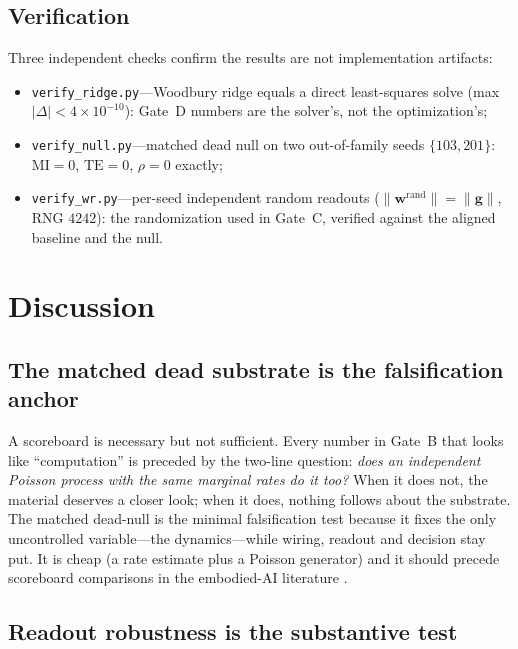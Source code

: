 \documentclass[10pt,a4paper]{article}
\newcommand{\MI}{\ensuremath{\mathrm{MI}}}
\newcommand{\TE}{\ensuremath{\mathrm{TE}}}
\begin{document}
\subsection{Verification}\label{sec:verify}
Three independent checks confirm the results are not implementation
artifacts:
\begin{itemize}[nosep]
\item \texttt{verify\_ridge.py}---Woodbury ridge equals a direct
least-squares solve (max $|\Delta|<4\times10^{-10}$): Gate~D numbers
are the solver's, not the optimization's;
\item \texttt{verify\_null.py}---matched dead null on two out-of-family
seeds $\{103,201\}$: $\MI=0$, $\TE=0$, $\rho=0$ exactly;
\item \texttt{verify\_wr.py}---per-seed independent random readouts
($\|\mathbf{w}^{\mathrm{rand}}\|=\|\mathbf{g}\|$, RNG $4242$): the
randomization used in Gate~C, verified against the aligned baseline
and the null.
\end{itemize}

\section{Discussion}\label{sec:discussion}

\subsection{The matched dead substrate is the falsification
anchor}\label{sec:disc1}

A scoreboard is necessary but not sufficient. Every number in
Gate~B that looks like ``computation'' is preceded by the two-line
question: \emph{does an independent Poisson process with the same
marginal rates do it too?} When it does not, the material deserves a
closer look; when it does, nothing follows about the substrate. The
matched dead-null is the minimal falsification test because it fixes
the only uncontrolled variable---the dynamics---while wiring, readout
and decision stay put. It is cheap (a rate estimate plus a Poisson
generator) and it should precede scoreboard comparisons in the
embodied-AI literature \cite{kagan2022dishbrain,balci2023neurons,
lukosevicius2009}.

\subsection{Readout robustness is the substantive test}\label{sec:disc2}
\end{document}
